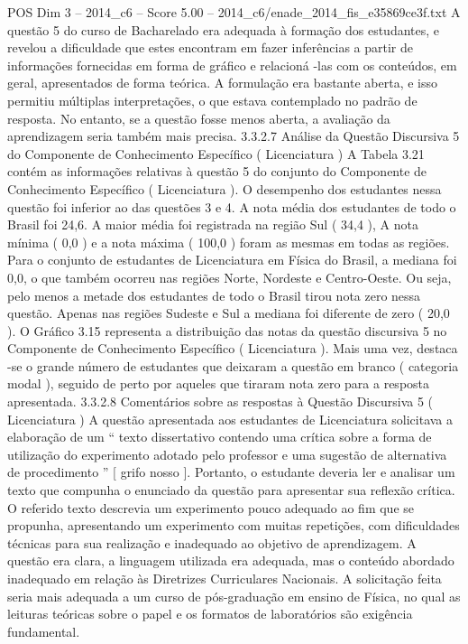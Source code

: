 \begin{textsample}{POS Dim 3 – 2014\_c6 – Score 5.00 – 2014\_c6/enade\_2014\_fis\_e35869ce3f.txt}
A questão 5 do curso de Bacharelado era adequada à formação dos estudantes, e revelou a dificuldade que estes encontram em fazer inferências a partir de informações fornecidas em forma de gráfico e relacioná -las com os conteúdos, em geral, apresentados de forma teórica.
A formulação era bastante aberta, e isso permitiu múltiplas interpretações, o que estava contemplado no padrão de resposta.
No entanto, se a questão fosse menos aberta, a avaliação da aprendizagem seria também mais precisa. 3.3.2.7 Análise da Questão Discursiva 5 do Componente de Conhecimento Específico ( Licenciatura ) A Tabela 3.21 contém as informações relativas à questão 5 do conjunto do Componente de Conhecimento Específico ( Licenciatura ).
O desempenho dos estudantes nessa questão foi inferior ao das questões 3 e 4.
A nota média dos estudantes de todo o Brasil foi 24,6.
A maior média foi registrada na região Sul ( 34,4 ), A nota mínima ( 0,0 ) e a nota máxima ( 100,0 ) foram as mesmas em todas as regiões.
Para o conjunto de estudantes de Licenciatura em Física do Brasil, a mediana foi 0,0, o que também ocorreu nas regiões Norte, Nordeste e Centro-Oeste.
Ou seja, pelo menos a metade dos estudantes de todo o Brasil tirou nota zero nessa questão.
Apenas nas regiões Sudeste e Sul a mediana foi diferente de zero ( 20,0 ).
O Gráfico 3.15 representa a distribuição das notas da questão discursiva 5 no Componente de Conhecimento Específico ( Licenciatura ).
Mais uma vez, destaca -se o grande número de estudantes que deixaram a questão em branco ( categoria modal ), seguido de perto por aqueles que tiraram nota zero para a resposta apresentada. 3.3.2.8 Comentários sobre as respostas à Questão Discursiva 5 ( Licenciatura ) A questão apresentada aos estudantes de Licenciatura solicitava a elaboração de um “ texto dissertativo contendo uma crítica sobre a forma de utilização do experimento adotado pelo professor e uma sugestão de alternativa de procedimento ” [ grifo nosso ].
Portanto, o estudante deveria ler e analisar um texto que compunha o enunciado da questão para apresentar sua reflexão crítica.
O referido texto descrevia um experimento pouco adequado ao fim que se propunha, apresentando um experimento com muitas repetições, com dificuldades técnicas para sua realização e inadequado ao objetivo de aprendizagem.
A questão era clara, a linguagem utilizada era adequada, mas o conteúdo abordado inadequado em relação às Diretrizes Curriculares Nacionais.
A solicitação feita seria mais adequada a um curso de pós-graduação em ensino de Física, no qual as leituras teóricas sobre o papel e os formatos de laboratórios são exigência fundamental.

\end{textsample}
